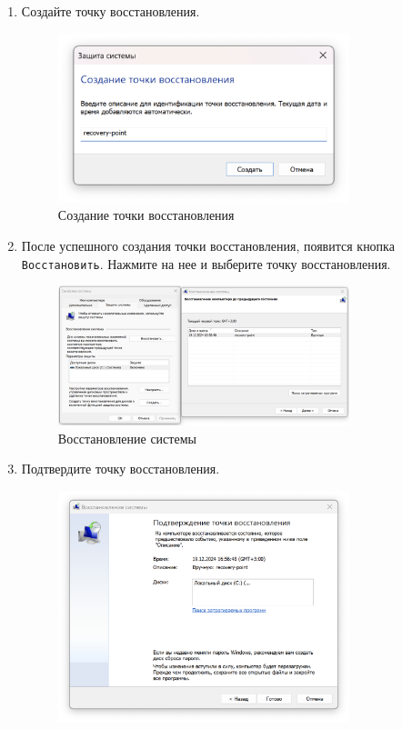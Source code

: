 \documentclass[a4paper, 14pt]{report}
\begin{document}
\begin{enumerate}
{\begin{enumerate}
              \item {Создайте точку восстановления.
                    \begin{figure}[H]
                        \centering
                        \includegraphics[width=0.8\textwidth]{../images/create-restore-point.png}
                        \caption{Создание точки восстановления}
                    \end{figure}
                    }
              \item {После успешного создания точки восстановления, появится кнопка \verb|Восстановить|. Нажмите на нее и выберите точку восстановления.
                    \begin{figure}[H]
                        \centering
                        \includegraphics[width=0.8\textwidth]{../images/restore-system.png}
                        \caption{Восстановление системы}
                    \end{figure}}
              \item {Подтвердите точку восстановления.
                    \begin{figure}[H]
                        \centering
                        \includegraphics[width=0.8\textwidth]{../images/restore-system-confirmation.png}

\end{figure}}
\end{enumerate}}
\end{enumerate}
\end{document}
